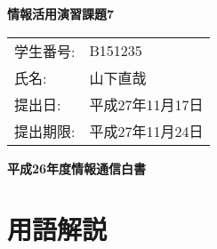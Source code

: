 \topmargin=-1.5cm
\textwidth=17cm
\textheight=25cm
\oddsidemargin=-0.5cm
\evensidemargin=-0.5cm


\begin{center}
  \Large\bf 情報活用演習課題7
\end{center}

\begin{flushright}
  \begin{tabular}{ll}
    学生番号: & B151235 \\
    氏名:     & 山下直哉 \\
    提出日:   & 平成27年11月17日 \\
    提出期限: & 平成27年11月24日 \\
  \end{tabular}
\end{flushright}

\begin{center}
  \large\bf 
  平成26年度情報通信白書
\end{center}

\section{用語解説}



